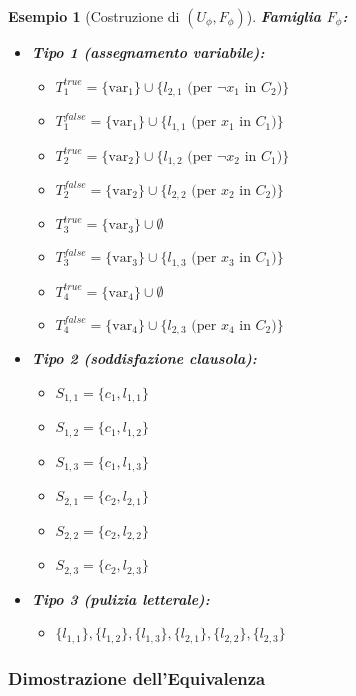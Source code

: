 \documentclass[a4paper]{article}
\newtheorem{example}{Esempio}
\begin{document}
\begin{example}[Costruzione di $(U_\phi, F_\phi)$]
\textbf{Famiglia $F_\phi$:}
\begin{itemize}
    \item \textbf{Tipo 1 (assegnamento variabile):}
    \begin{itemize}
        \item $T_1^{true} = \{\text{var}_1\} \cup \{l_{2,1} \text{ (per } \neg x_1 \text{ in } C_2)\}$
        \item $T_1^{false} = \{\text{var}_1\} \cup \{l_{1,1} \text{ (per } x_1 \text{ in } C_1)\}$
        \item $T_2^{true} = \{\text{var}_2\} \cup \{l_{1,2} \text{ (per } \neg x_2 \text{ in } C_1)\}$
        \item $T_2^{false} = \{\text{var}_2\} \cup \{l_{2,2} \text{ (per } x_2 \text{ in } C_2)\}$
        \item $T_3^{true} = \{\text{var}_3\} \cup \emptyset$
        \item $T_3^{false} = \{\text{var}_3\} \cup \{l_{1,3} \text{ (per } x_3 \text{ in } C_1)\}$
        \item $T_4^{true} = \{\text{var}_4\} \cup \emptyset$
        \item $T_4^{false} = \{\text{var}_4\} \cup \{l_{2,3} \text{ (per } x_4 \text{ in } C_2)\}$
    \end{itemize}
    \item \textbf{Tipo 2 (soddisfazione clausola):}
    \begin{itemize}
        \item $S_{1,1} = \{c_1, l_{1,1}\}$
        \item $S_{1,2} = \{c_1, l_{1,2}\}$
        \item $S_{1,3} = \{c_1, l_{1,3}\}$
        \item $S_{2,1} = \{c_2, l_{2,1}\}$
        \item $S_{2,2} = \{c_2, l_{2,2}\}$
        \item $S_{2,3} = \{c_2, l_{2,3}\}$
    \end{itemize}
    \item \textbf{Tipo 3 (pulizia letterale):}
    \begin{itemize}
        \item $\{l_{1,1}\}, \{l_{1,2}\}, \{l_{1,3}\}, \{l_{2,1}\}, \{l_{2,2}\}, \{l_{2,3}\}$
    \end{itemize}
\end{itemize}
\end{example}

\subsubsection{Dimostrazione dell'Equivalenza}
\end{document}
